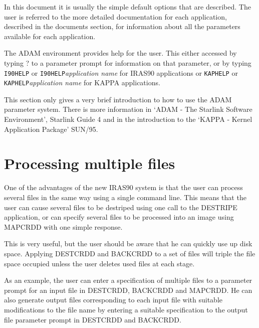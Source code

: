 In this document it is usually the simple default options that are described.
The user is referred to the more detailed documentation for each application,
described in the documents section, for information about all the parameters
available for each application.

The ADAM environment provides help for the user. This either accessed by typing
? to a parameter prompt for information on that parameter, or by typing
{\tt I90HELP} or {\tt I90HELP}{\it application name} for IRAS90 applications or 
{\tt KAPHELP} or {\tt KAPHELP}{\it application name} for KAPPA applications.

This section only gives a very brief introduction to how to use the ADAM
parameter system. There is more information in `ADAM - The Starlink Software
Environment', Starlink Guide 4 and in the introduction to the `KAPPA - Kernel
Application Package' SUN/95.
\section{Processing multiple files}
\label{m:promult}
One of the advantages of the new IRAS90 system is that the user can process
several  files in the same way using a single command line. This means that
the user can cause several files to be destriped using one call to the DESTRIPE
application, or can specify several files to be processed into an image using
MAPCRDD with one simple response.

This is very useful, but the user should be aware that he can quickly use up
disk space. Applying DESTCRDD and BACKCRDD to a set of files will triple the
file space occupied unless the user deletes used files at each stage.

As an example, the user can enter a specification of multiple files to a
parameter prompt for an input file in DESTCRDD, BACKCRDD and MAPCRDD. He can
also generate output files corresponding to each input file with suitable
modifications to the file name by entering a suitable specification to the
output file parameter prompt in DESTCRDD and BACKCRDD.

